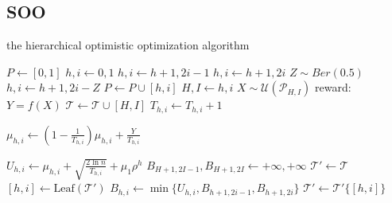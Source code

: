 \documentclass[a4paper,10pt]{article}
\begin{document}
\subsection{SOO}
\begin{algorithm}[!ht]
\caption{the hierarchical optimistic optimization algorithm}
\begin{algorithmic}[1]
		\State $P \gets {[0,1]}$
		\State $h,i\gets 0,1$
				\State $h,i \gets h+1,2i-1 $
				\State $h,i \gets h+1,2i $
			\Else
				\State $Z \sim Ber(0.5)$
				\State $h,i \gets h+1,2i-Z$
			\EndIf
			\State $P \gets P \cup {[h,i]}$
		\EndWhile
		\State $H,I \gets h,i$
		\State $X \sim \mathcal{U}(\mathcal{P}_{H,I})$
		\State reward: $Y = f(X)$
		\State $\mathcal{T} \gets \mathcal{T} \cup {[H,I]}$
			\State $T_{h,i} \gets T_{h,i}+1$
			\begin{large}
			\State $\mu_{h,i}\gets (1-\frac{1}{T_{h,i}})\mu_{h,i}+\frac{Y}{T_{h,i}}$
			\end{large}
		\EndFor
			\State $U_{h,i}\gets \mu_{h,i}+\sqrt{\frac{2\ln n}{T_{h,i}}}+\mu_1 \rho^h$
		\EndFor
		\State $B_{H+1,2I-1},B_{H+1,2I} \gets +\infty,+\infty$
		\State $\mathcal{T}' \gets \mathcal{T}$
			\State $[h,i] \gets \text{Leaf}(\mathcal{T}')$
			\State $B_{h,i} \gets \min\{U_{h,i},B_{h+1,2i-1},B_{h+1,2i}\}$
			\State $\mathcal{T}' \gets \mathcal{T}'\{[h,i]\}$
		\EndWhile
	\EndFor
\end{algorithmic}
\end{algorithm}
\end{document}
